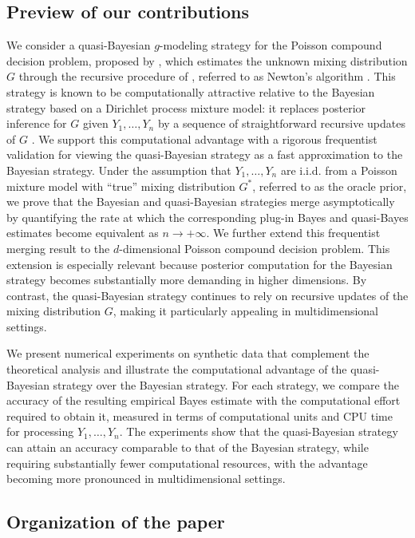 \documentclass[twoside,12pt]{article}
\begin{document}
\subsection{Preview of our contributions}

We consider a quasi-Bayesian $g$-modeling strategy for the Poisson compound decision problem, proposed by \citet{Fav(24)}, which estimates the unknown mixing distribution $G$ through the recursive procedure of \citet{Smi(78)}, referred to as Newton's algorithm \citep{New(98),Mar(08)}. This strategy is known to be computationally attractive relative to the Bayesian strategy based on a Dirichlet process mixture model: it replaces posterior inference for $G$ given $Y_{1},\ldots,Y_{n}$ by a sequence of straightforward recursive updates of $G$ \citep{For(20),Fav(24)}. We support this computational advantage with a rigorous frequentist validation for viewing the quasi-Bayesian strategy as a fast approximation to the Bayesian strategy. Under the assumption that $Y_1,\ldots,Y_n$ are i.i.d. from a Poisson mixture model with ``true''  mixing distribution \(G^\ast\), referred to as the oracle prior, we prove that the Bayesian and quasi-Bayesian strategies merge asymptotically by quantifying the rate at which the corresponding plug-in Bayes and quasi-Bayes estimates become equivalent as $n\rightarrow+\infty$. We further extend this frequentist merging result to the $d$-dimensional Poisson compound decision problem. This extension is especially relevant because posterior computation for the Bayesian strategy becomes substantially more demanding in higher dimensions. By contrast, the quasi-Bayesian strategy continues to rely on recursive updates of the mixing distribution $G$, making it particularly appealing in multidimensional settings.

We present numerical experiments on synthetic data that complement the theoretical analysis and illustrate the computational advantage of the quasi-Bayesian strategy over the Bayesian strategy. For each strategy, we compare the accuracy of the resulting empirical Bayes estimate with the computational effort required to obtain it, measured in terms of computational units and CPU time for processing $Y_{1},\ldots,Y_{n}$. The experiments show that the quasi-Bayesian strategy can attain an accuracy comparable to that of the Bayesian strategy, while requiring substantially fewer computational resources, with the advantage becoming more pronounced in multidimensional settings.

\subsection{Organization of the paper}
\end{document}
